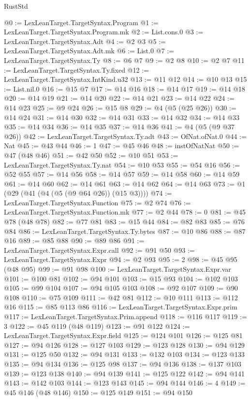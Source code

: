 \begin{lexlean}{RustStd}
\begin{coremodule}
{\begin{coremodule}
{{{{{{{{{{{{{{{{{{{{{{{{{{{{{{{{{{{{{@0 := LexLeanTarget.TargetSyntax.Program
@1 := LexLeanTarget.TargetSyntax.Program.mk
@2 := List.cons.{0}
@3 := LexLeanTarget.TargetSyntax.Adt
@4 := @2 @3
@5 := LexLeanTarget.TargetSyntax.Adt.mk
@6 := List.{0}
@7 := LexLeanTarget.TargetSyntax.Ty
@8 := @6 @7
@9 := @2 @8
@10 := @2 @7
@11 := LexLeanTarget.TargetSyntax.Ty.fixed
@12 := LexLeanTarget.TargetSyntax.IntKind.u32
@13 := @11 @12
@14 := @10 @13
@15 := List.nil.{0}
@16 := @15 @7
@17 := @14 @16
@18 := @14 @17
@19 := @14 @18
@20 := @14 @19
@21 := @14 @20
@22 := @14 @21
@23 := @14 @22
@24 := @14 @23
@25 := @9 @24
@26 := @15 @8
@29 := @4 (@5 (@25 @26))
@30 := @14 @24
@31 := @14 @30
@32 := @14 @31
@33 := @14 @32
@34 := @14 @33
@35 := @14 @34
@36 := @14 @35
@37 := @14 @36
@41 := @4 (@5 (@9 @37 @26))
@42 := LexLeanTarget.TargetSyntax.Ty.adt
@43 := OfNat.ofNat.{0}
@44 := Nat
@45 := @43 @44
@46 := 1
@47 := @45 @46
@48 := instOfNatNat
@50 := @47 (@48 @46)
@51 := @42 @50
@52 := @10 @51
@53 := LexLeanTarget.TargetSyntax.Ty.nat
@54 := @10 @53
@55 := @54 @16
@56 := @52 @55
@57 := @14 @56
@58 := @14 @57
@59 := @14 @58
@60 := @14 @59
@61 := @14 @60
@62 := @14 @61
@63 := @14 @62
@64 := @14 @63
@73 := @1 (@29 (@41 (@4 (@5 (@9 @64 @26)) (@15 @3))))
@74 := LexLeanTarget.TargetSyntax.Function
@75 := @2 @74
@76 := LexLeanTarget.TargetSyntax.Function.mk
@77 := @2 @44
@78 := 0
@81 := @45 @78 (@48 @78)
@82 := @77 @81
@83 := @15 @44
@84 := @82 @83
@85 := @76 @84
@86 := LexLeanTarget.TargetSyntax.Ty.bytes
@87 := @10 @86
@88 := @87 @16
@89 := @85 @88
@90 := @89 @86
@91 := LexLeanTarget.TargetSyntax.Expr.call
@92 := @91 @50
@93 := LexLeanTarget.TargetSyntax.Expr
@94 := @2 @93
@95 := 2
@98 := @45 @95 (@48 @95)
@99 := @91 @98
@100 := LexLeanTarget.TargetSyntax.Expr.var
@101 := @100 @81
@102 := @94 @101
@103 := @15 @93
@104 := @102 @103
@105 := @99 @104
@107 := @94 @105 @103
@108 := @92 @107
@109 := @90 @108
@110 := @75 @109
@111 := @42 @81
@112 := @10 @111
@113 := @112 @16
@115 := @85 @113 @86
@116 := LexLeanTarget.TargetSyntax.Expr.prim
@117 := LexLeanTarget.TargetSyntax.Prim.append
@118 := @116 @117
@119 := 3
@122 := @45 @119 (@48 @119)
@123 := @91 @122
@124 := LexLeanTarget.TargetSyntax.Expr.field
@125 := @124 @101
@126 := @125 @81
@127 := @94 @126
@128 := @127 @103
@129 := @123 @128
@130 := @94 @129
@131 := @125 @50
@132 := @94 @131
@133 := @132 @103
@134 := @123 @133
@135 := @94 @134
@136 := @125 @98
@137 := @94 @136
@138 := @137 @103
@139 := @123 @138
@140 := @94 @139
@141 := @125 @122
@142 := @94 @141
@143 := @142 @103
@144 := @123 @143
@145 := @94 @144
@146 := 4
@149 := @45 @146 (@48 @146)
@150 := @125 @149
@151 := @94 @150
}}}}}}}}}}}}}}}}}}}}}}}}}}}}}}}}}}}}}
\end{coremodule}}
\end{coremodule}
\end{lexlean}

